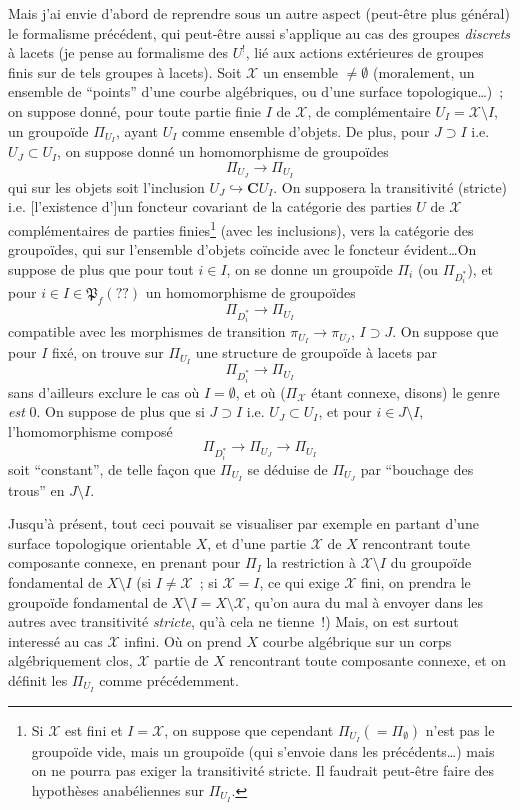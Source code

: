 Mais j'ai envie d'abord de reprendre sous un autre aspect (peut-être plus général) le formalisme précédent, qui  peut-être aussi s'applique au cas des groupes \emph{discrets} à lacets (je pense au formalisme des $U^!$, lié aux actions extérieures de groupes finis sur de tels groupes à lacets). Soit $\mathcal{X}$ un ensemble $\ne\emptyset$ (moralement, un ensemble de ``points'' d'une courbe algébriques, ou d'une surface topologique\dots)~;  on suppose donné, pour toute partie finie $I$ de $\mathcal{X}$, de complémentaire $U_I=\mathcal{X}\setminus I$, un groupoïde $\Pi_{U_I}$, ayant $U_I$ comme ensemble d'objets. De plus, pour $J\supset I$ i.e. $U_J\subset U_I$, on suppose donné un homomorphisme de groupoïdes
$$
\Pi_{U_J} \to \Pi_{U_I}
$$
qui sur les objets soit l'inclusion $U_J\hookrightarrow \mathbf{C}U_I$. On supposera la transitivité (stricte) i.e. [l'existence d']un foncteur covariant de la catégorie des parties $U$ de $\mathcal{X}$ complémentaires de parties finies\footnote{Si $\mathcal{X}$ est fini et $I=\mathcal{X}$, on suppose que cependant $\Pi_{U_I}(=\Pi_\emptyset)$ n'est pas le groupoïde vide, mais un groupoïde (qui s'envoie dans les précédents\dots) mais on ne pourra pas exiger la transitivité stricte. Il faudrait peut-être faire des hypothèses anabéliennes sur $\Pi_{U_I}$.} (avec les inclusions), vers la catégorie des groupoïdes, qui sur l'ensemble d'objets coïncide avec le foncteur évident\dots On suppose de plus que pour tout $i\in I$, on se donne un groupoïde $\Pi_i$ (ou $\Pi_{D^*_i}$), et pour $i\in I\in{\mathfrak{P}}_f(??)$ un homomorphisme de groupoïdes 
$$
\Pi_{D^*_i}\to\Pi_{U_I}
$$
compatible avec les morphismes de transition $\pi_{U_I}\to \pi_{U_J}$, $I\supset J$. On suppose que pour $I$ fixé, on trouve sur $\Pi_{U_I}$ une structure de groupoïde à lacets par 
$$
\Pi_{D^*_i}\to\Pi_{U_I}
$$
sans d'ailleurs exclure le cas où $I=\emptyset$, et où ($\Pi_\mathcal{X}$ étant connexe, disons) le genre \emph{est} $0$. On suppose de plus que si $J\supset I$ i.e. $U_J\subset U_I$, et pour $i\in J\setminus I$, l'homomorphisme composé
$$
\Pi_{D^*_i}\to\Pi_{U_J}\to\Pi_{U_I}
$$
soit ``constant'', de telle fa\c{c}on que $\Pi_{U_I}$ se déduise de $\Pi_{U_J}$ par ``bouchage des trous'' en $J\setminus I$.

Jusqu'à présent, tout ceci pouvait se visualiser par exemple en partant d'une surface topologique orientable $X$, et d'une partie $\mathcal{X}$ de $X$ rencontrant toute composante connexe, en prenant pour $\Pi_I$ la restriction à $\mathcal{X}\setminus I$ du groupoïde fondamental de $X\setminus I$ (si $I\ne\mathcal{X}$~; si $\mathcal{X}=I$, ce qui exige $\mathcal{X}$ fini, on prendra le groupoïde fondamental de $X\setminus I=X\setminus\mathcal{X}$, qu'on aura du mal à envoyer dans les autres avec transitivité \emph{stricte}, qu'à cela ne tienne~!) Mais, on est surtout interessé au cas $\mathcal{X}$ infini. Où on prend $X$ courbe algébrique sur un corps algébriquement clos, $\mathcal{X}$ partie de $X$ rencontrant toute composante connexe, et on définit les $\Pi_{U_I}$ comme précédemment.  

